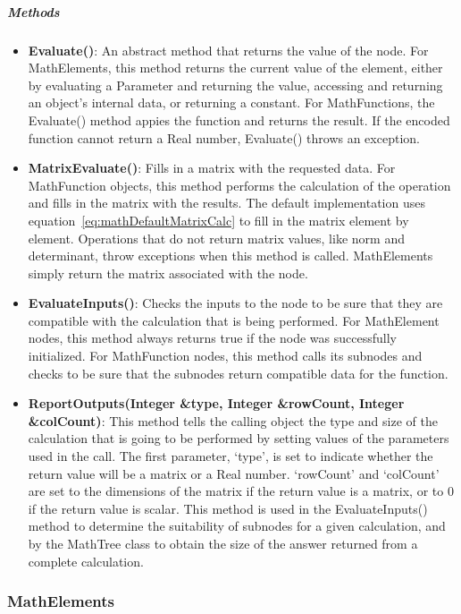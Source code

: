 \subparagraph{\textit{Methods}}
\begin{itemize}
\item \textbf{Evaluate()}: An abstract method that returns the value of the node.  For MathElements,
this method returns the current value of the element, either by evaluating a Parameter and returning
the value, accessing and returning an object's internal data, or returning a constant.  For
MathFunctions, the Evaluate() method appies the function and returns the result.  If the encoded
function cannot return a Real number, Evaluate() throws an exception.
\item \textbf{MatrixEvaluate()}: Fills in a matrix with the requested data.  For MathFunction
objects, this method performs the calculation of the operation and fills in the matrix with the
results.  The default implementation uses equation~\ref{eq:mathDefaultMatrixCalc} to fill in the
matrix element by element.  Operations that do not return matrix values, like norm and determinant,
throw exceptions when this method is called.  MathElements simply return the matrix associated with
the node.
\item \textbf{EvaluateInputs()}: Checks the inputs to the node to be sure that they are compatible
with the calculation that is being performed.  For MathElement nodes, this method always returns
true if the node was successfully initialized.  For MathFunction nodes, this method calls its
subnodes and checks to be sure that the subnodes return compatible data for the function.
\item \textbf{ReportOutputs(Integer \&type, Integer \&rowCount, Integer \&colCount)}:  This method
tells the calling object the type and size of the calculation that is going to be performed by
setting values of the parameters used in the call.  The first parameter, `type', is set to indicate
whether the return value will be a matrix or a Real number.  `rowCount' and `colCount' are set to
the dimensions of the matrix if the return value is a matrix, or to 0 if the return value is scalar.
 This method is used in the EvaluateInputs() method to determine the suitability of subnodes for a
given calculation, and by the MathTree class to obtain the size of the answer returned from a
complete calculation.
\end{itemize}

\subsubsection{MathElements}


